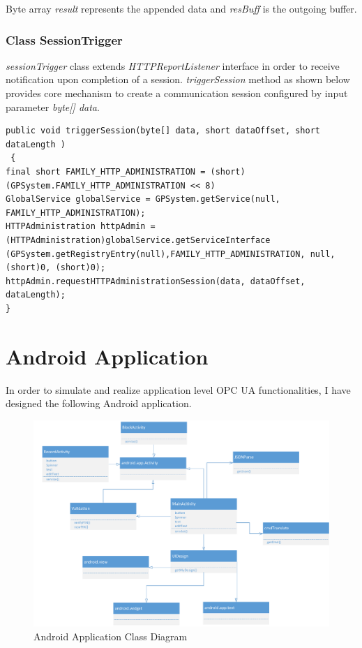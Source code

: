 Byte array \emph{result} represents the appended data and \emph{resBuff} is the outgoing buffer. 

\subsubsection{Class SessionTrigger}
\emph{sessionTrigger} class extends \emph{HTTPReportListener} interface in order to receive notification upon completion of a session.
\emph{triggerSession} method as shown below provides core mechanism to create a communication session configured by input parameter \emph{byte[] data}.
\begin{Verbatim}[fontsize=\relsize{-2}, frame=lines,framesep=4mm, label=\fbox{\small\emph{Trigger Session}}]
public void triggerSession(byte[] data, short dataOffset, short dataLength )
 {
final short FAMILY_HTTP_ADMINISTRATION = (short) (GPSystem.FAMILY_HTTP_ADMINISTRATION << 8)
GlobalService globalService = GPSystem.getService(null, FAMILY_HTTP_ADMINISTRATION);
HTTPAdministration httpAdmin = (HTTPAdministration)globalService.getServiceInterface
(GPSystem.getRegistryEntry(null),FAMILY_HTTP_ADMINISTRATION, null, (short)0, (short)0);
httpAdmin.requestHTTPAdministrationSession(data, dataOffset, dataLength);
}
\end{Verbatim}

\section{Android Application}
In order to simulate and realize application level  OPC UA functionalities, I have designed the following Android application.


\begin{figure}[!htb]
	\centering
	\includegraphics[width=1\textwidth]{android-class}
		\caption{Android Application Class Diagram}
	\label{fig:android-class}
\end{figure}

